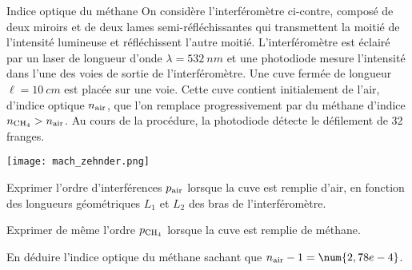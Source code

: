 \begin{exo}[PC][1][TD]{Indice optique du méthane}
  On considère l'interféromètre ci-contre, composé de deux miroirs et de deux lames semi-réfléchissantes qui transmettent la moitié de l'intensité lumineuse et réfléchissent l'autre moitié. L'interféromètre est éclairé par un laser de longueur d'onde $\lambda=\SI{532}{nm}$ et une photodiode mesure l'intensité dans l'une des voies de sortie de l'interféromètre. Une cuve fermée de longueur $\ell=\SI{10}{cm}$ est placée sur une voie. Cette cuve contient initialement de l'air, d'indice optique $n_{\rm{air}}$, que l'on remplace progressivement par du méthane d'indice $n_{\rm{CH}_4}>n_{\rm{air}}$. Au cours de la procédure, la photodiode détecte le défilement de 32 franges.
  
  \begin{center}
  \texttt{[image: mach\_zehnder.png]}
  \end{center}
  
  \begin{questions}
  \item Exprimer l'ordre d'interférences $p_{\rm{air}}$ lorsque la cuve est remplie d'air, en fonction des longueurs géométriques $L_1$ et $L_2$ des bras de l'interféromètre.
  \item Exprimer de même l'ordre $p_{\rm{CH}_4}$ lorsque la cuve est remplie de méthane.
  \item En déduire l'indice optique du méthane sachant que $n_{\rm{air}}-1=\num{2,78e-4}$.
  \end{questions}
  \end{exo}


